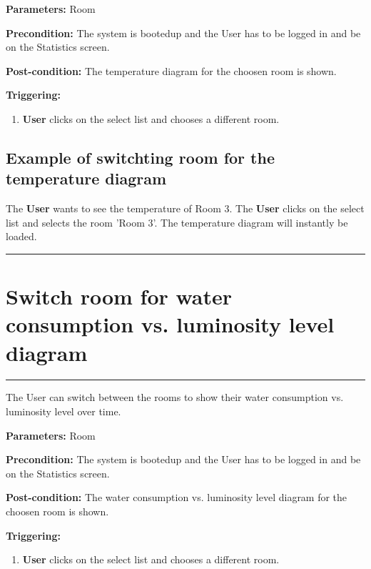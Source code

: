 \begin{description}

\item \textbf{Parameters:} Room
\item \textbf{Precondition:} The system is bootedup and the User has to be
logged in and be on the Statistics screen.
\item \textbf{Post-condition:} The temperature diagram for the choosen room is shown.
\item \textbf{Triggering:}
\begin{enumerate}

\item \textbf{User} clicks on the select list and chooses a different room.

\end{enumerate}
\end{description}

\subsection{Example of switchting room for the temperature diagram}
The \textbf{User} wants to see the temperature of Room 3. The \textbf{User} clicks on the select list and selects the room 'Room 3'. The temperature diagram will instantly be loaded.
\hfill
\vspace{0.5cm}
\hrule




\section{Switch room for water consumption vs. luminosity level diagram}
\hrule
\hfill
\vspace{0.5cm}
\label{operation:Switch room for water consumption vs. luminosity level diagram}

The User can switch between the rooms to show their water consumption vs. luminosity level over time.

\begin{description}

\item \textbf{Parameters:} Room
\item \textbf{Precondition:} The system is bootedup and the User has to be
logged in and be on the Statistics screen.
\item \textbf{Post-condition:} The water consumption vs. luminosity level diagram for the choosen room is shown.
\item \textbf{Triggering:}
\begin{enumerate}

\item \textbf{User} clicks on the select list and chooses a different room.

\end{enumerate}
\end{description}


